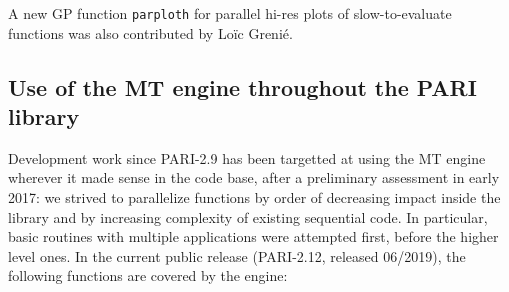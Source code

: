 \documentclass{deliverablereport}
\begin{document}
A new GP function \texttt{parploth} for parallel hi-res plots of
slow-to-evaluate functions was also contributed by Lo\"ic Greni\'e.

\subsection{Use of the MT engine throughout the PARI library}
Development work since PARI-2.9 has been targetted at using the MT engine
wherever it made sense in the \Pari code base, after a preliminary assessment
in early 2017: we strived to parallelize functions by order of decreasing
impact inside the \Pari library and by increasing complexity of existing
sequential code. In particular, basic routines with multiple applications
were attempted first, before the higher level ones. In the current public
release (PARI-2.12, released 06/2019), the following functions are covered by
the engine:
\end{document}
